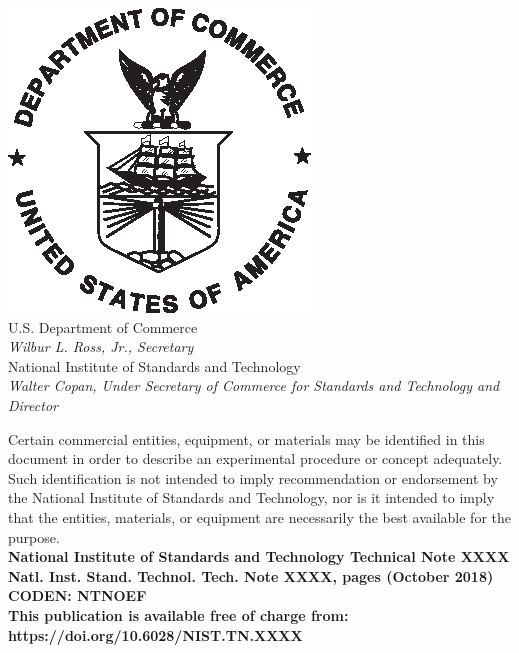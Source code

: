 \documentclass[12pt]{article}
\newcommand{\pubnumber}{XXXX}
\newcommand{\DOI}{https://doi.org/10.6028/NIST.TN.XXXX}
\newcommand{\monthyear}{October 2018}
\begin{document}
\begin{titlepage}
\begin{flushright}
\includegraphics[width=0.18\linewidth]{DoC-logo.eps}\\
\vfill
\footnotesize U.S. Department of Commerce\\
\textit{Wilbur L. Ross, Jr., Secretary}\\
\vspace{10pt}
National Institute of Standards and Technology\\
\textit{Walter Copan, Under Secretary of Commerce for Standards and Technology and Director}
\end{flushright}
\end{titlepage}

\begin{titlepage}
\begin{flushright}
\footnotesize  Certain commercial entities, equipment, or materials may be identified in this document in order to describe an experimental procedure or concept adequately. Such identification is not intended to imply recommendation or endorsement by the National Institute of Standards and Technology, nor is it intended to imply that the entities, materials, or equipment are necessarily the best available for the purpose.\\
\vfill
\normalsize \textbf{National Institute of Standards and Technology Technical Note \pubnumber\\
Natl. Inst. Stand. Technol. Tech. Note \pubnumber, \pageref{LastPage} pages (\monthyear)} \\
\textbf{CODEN: NTNOEF}\\
\vspace{12pt}
\textbf{This publication is available free of charge from: \DOI}
\vfill
\end{flushright}
\end{titlepage}
\end{document}
